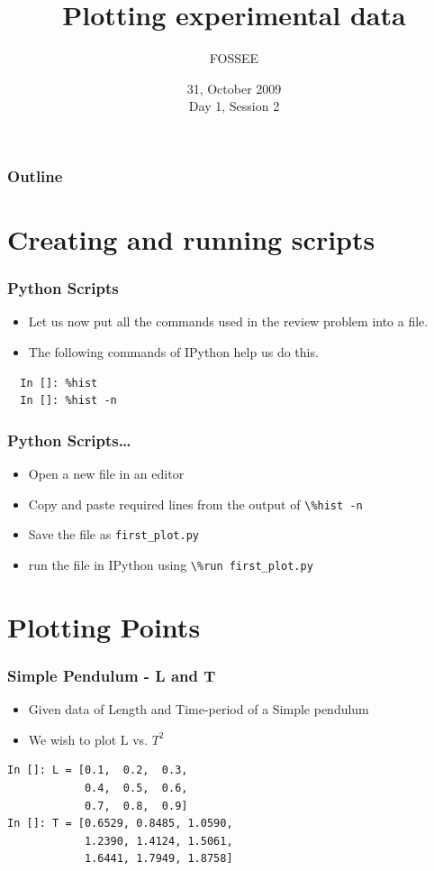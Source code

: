 \documentclass[14pt,compress]{beamer}
\title[Plotting using Python]{Plotting experimental data\\}
\author[FOSSEE] {FOSSEE}
\institute[IIT Bombay] {Department of Aerospace Engineering\\IIT Bombay}
\date[] {31, October 2009\\Day 1, Session 2}
\newcommand{\typ}[1]{\lstinline{#1}}
\begin{document}
\begin{frame}
  \titlepage
\end{frame}

\begin{frame}
  \frametitle{Outline}
  \tableofcontents
\end{frame}

\section{Creating and running scripts}
\begin{frame}[fragile]
\frametitle{Python Scripts}
\begin{itemize}
\item Let us now put all the commands used in the review problem into a file. 
\item The following commands of IPython help us do this. 
\end{itemize}
\begin{lstlisting}
  In []: %hist
  In []: %hist -n
\end{lstlisting}
\end{frame}

\begin{frame}
\frametitle{Python Scripts\ldots}
  \begin{itemize}
    \item Open a new file in an \alert{editor}
    \item Copy and paste required lines from the output of \typ{\%hist -n}
    \item Save the file as \typ{first_plot.py}
  \end{itemize}
  \begin{itemize}
  \item run the file in IPython using \typ{\%run first_plot.py}\\
  \end{itemize}
\end{frame}

\section{Plotting Points}
\begin{frame}[fragile]
\frametitle{Simple Pendulum - L and T}
  \begin{itemize}
    \item Given data of Length and Time-period of a Simple pendulum 
    \item We wish to plot L vs. \alert{$T^2$}
  \end{itemize}    
\begin{lstlisting}
In []: L = [0.1,  0.2,  0.3,  
            0.4,  0.5,  0.6,  
            0.7,  0.8,  0.9]
In []: T = [0.6529, 0.8485, 1.0590, 
            1.2390, 1.4124, 1.5061, 
            1.6441, 1.7949, 1.8758]
\end{lstlisting}
\end{frame}
\end{document}
